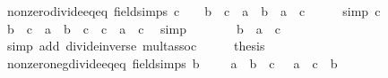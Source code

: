 \begin{isabellebody}
\ nonzero{\isacharunderscore}{\kern0pt}divide{\isacharunderscore}{\kern0pt}eq{\isacharunderscore}{\kern0pt}eq\ {\isacharbrackleft}{\kern0pt}field{\isacharunderscore}{\kern0pt}simps{\isacharbrackright}{\kern0pt}{\isacharcolon}{\kern0pt}\ {\isachardoublequoteopen}c\ {\isasymnoteq}\ {}\ {\isasymLongrightarrow}\ b\ {\isacharslash}{\kern0pt}\ c\ {\isacharequal}{\kern0pt}\ a\ {\isasymlongleftrightarrow}\ b\ {\isacharequal}{\kern0pt}\ a\ {\isacharasterisk}{\kern0pt}\ c{\isachardoublequoteclose}\isanewline
%
\isadelimproof
%
\endisadelimproof
%
\isatagproof
{}\isamarkupfalse%
\ {\isacharminus}{\kern0pt}\isanewline
\ \ \isamarkupfalse%
\ {\isacharbrackleft}{\kern0pt}simp{\isacharbrackright}{\kern0pt}{\isacharcolon}{\kern0pt}\ {\isachardoublequoteopen}c\ {\isasymnoteq}\ {}{\isachardoublequoteclose}\isanewline
\ \ \isamarkupfalse%
\ {\isachardoublequoteopen}b\ {\isacharslash}{\kern0pt}\ c\ {\isacharequal}{\kern0pt}\ a\ {\isasymlongleftrightarrow}\ {\isacharparenleft}{\kern0pt}b\ {\isacharslash}{\kern0pt}\ c{\isacharparenright}{\kern0pt}\ {\isacharasterisk}{\kern0pt}\ c\ {\isacharequal}{\kern0pt}\ a\ {\isacharasterisk}{\kern0pt}\ c{\isachardoublequoteclose}\ \isamarkupfalse%
\ simp\isanewline
\ \ \isamarkupfalse%
\ \isamarkupfalse%
\ {\isachardoublequoteopen}{\isachardot}{\kern0pt}{\isachardot}{\kern0pt}{\isachardot}{\kern0pt}\ {\isasymlongleftrightarrow}\ b\ {\isacharequal}{\kern0pt}\ a\ {\isacharasterisk}{\kern0pt}\ c{\isachardoublequoteclose}\ \isamarkupfalse%
\ {\isacharparenleft}{\kern0pt}simp\ add{\isacharcolon}{\kern0pt}\ divide{\isacharunderscore}{\kern0pt}inverse\ mult{\isachardot}{\kern0pt}assoc{\isacharparenright}{\kern0pt}\isanewline
\ \ \isamarkupfalse%
\ \isamarkupfalse%
\ {\isacharquery}{\kern0pt}thesis\ \isacommand{{\isachardot}{\kern0pt}}\isamarkupfalse%
\isanewline
{}\isamarkupfalse%
%
\endisatagproof
{\isafoldproof}%
%
\isadelimproof
\isanewline
%
\endisadelimproof
\isanewline
{}\isamarkupfalse%
\ nonzero{\isacharunderscore}{\kern0pt}neg{\isacharunderscore}{\kern0pt}divide{\isacharunderscore}{\kern0pt}eq{\isacharunderscore}{\kern0pt}eq\ {\isacharbrackleft}{\kern0pt}field{\isacharunderscore}{\kern0pt}simps{\isacharbrackright}{\kern0pt}{\isacharcolon}{\kern0pt}\ {\isachardoublequoteopen}b\ {\isasymnoteq}\ {}\ {\isasymLongrightarrow}\ {\isacharminus}{\kern0pt}\ {\isacharparenleft}{\kern0pt}a\ {\isacharslash}{\kern0pt}\ b{\isacharparenright}{\kern0pt}\ {\isacharequal}{\kern0pt}\ c\ {\isasymlongleftrightarrow}\ {\isacharminus}{\kern0pt}\ a\ {\isacharequal}{\kern0pt}\ c\ {\isacharasterisk}{\kern0pt}\ b{\isachardoublequoteclose}\isanewline

\end{isabellebody}
